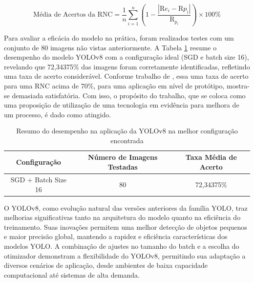 \begin{equation} \text{Média de Acertos da RNC} = \frac{1}{n} \sum_{i=1}^{n} \left(1 - \frac{|\text{R}{e_i} - \text{R}{p_i}|}{\text{R}_{p_i}}\right) \times 100\% \label{eq:media-identificacao} \end{equation}

Para avaliar a eficácia do modelo na prática, foram realizados testes com um conjunto de 80 imagens não vistas anteriormente. A Tabela \ref{tab:yolov8-eval} resume o desempenho do modelo YOLOv8 com a configuração ideal (SGD e batch size 16), revelando que 72,34375\% das imagens foram corretamente identificadas, refletindo uma taxa de acerto considerável. Conforme trabalho de \cite{barbado2022aplicaccao}, essa uma taxa de acerto para uma RNC acima de 70\%, para uma aplicação em nível de protótipo, mostra-se demasiada satisfatória. Com isso, o propósito do trabalho, que se coloca como uma proposição de utilização de uma tecnologia em evidência para melhora de um processo, é dado como atingido. 

\begin{table}[!hbt]
    \centering
    \begin{tabular}{|c|c|c|}
        \hline
        \textbf{Configuração} & \textbf{Número de Imagens Testadas} & \textbf{Taxa Média de Acerto} \\ \hline
        SGD + Batch Size 16 & 80 & 72,34375\% \\ \hline
    \end{tabular}
    \caption{Resumo do desempenho na aplicação da YOLOv8 na melhor configuração encontrada}
    \label{tab:yolov8-eval}
\end{table}

O YOLOv8, como evolução natural das versões anteriores da família YOLO, traz melhorias significativas tanto na arquitetura do modelo quanto na eficiência do treinamento. Suas inovações permitem uma melhor detecção de objetos pequenos e maior precisão global, mantendo a rapidez e eficiência características dos modelos YOLO. A combinação de ajustes no tamanho do batch e a escolha do otimizador demonstram a flexibilidade do YOLOv8, permitindo sua adaptação a diversos cenários de aplicação, desde ambientes de baixa capacidade computacional até sistemas de alta demanda.

